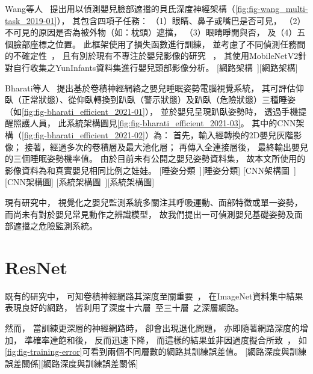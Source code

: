 \documentclass[class=NCU_thesis, crop=false]{standalone}
\begin{document}
Wang等人~\cite{wang_multi-task_2019}
提出用以偵測嬰兒臉部遮擋的貝氏深度神經架構（\cref{fig:fig-wang_multi-task_2019-01}），
其包含四項子任務：
（1）眼睛、鼻子或嘴巴是否可見，
（2）不可見的原因是否為被外物（如：枕頭）遮擋，
（3）眼睛睜開與否，
及（4）五個臉部座標之位置。
此框架使用了損失函數進行訓練，
並考慮了不同偵測任務間的不確定性~\cite{kendall_what_2017}，
且有別於現有不專注於嬰兒影像的研究
~\cite{viitaniemi_detecting_2013, ge_detecting_2017, ghiasi_using_2015}，
其使用MobileNetV2針對自行收集之YunInfants資料集進行嬰兒頭部影像分析。
[網路架構~\cite{wang_multi-task_2019}][網路架構]

Bharati等人~\cite{bharati_efficient_2021}
提出基於卷積神經網絡之嬰兒睡眠姿勢電腦視覺系統，
其可評估仰臥（正常狀態）、從仰臥轉換到趴臥（警示狀態）及趴臥（危險狀態）三種睡姿
（如\cref{fig:fig-bharati_efficient_2021-01}），
並於嬰兒呈現趴臥姿勢時，
透過手機提醒照護人員，
此系統架構圖見\cref{fig:fig-bharati_efficient_2021-03}。
其中的CNN架構（\cref{fig:fig-bharati_efficient_2021-02}）為：
首先，輸入經轉換的2D嬰兒灰階影像；
接著，經過多次的卷積層及最大池化層；
再傳入全連接層後，
最終輸出嬰兒的三個睡眠姿勢機率值。
由於目前未有公開之嬰兒姿勢資料集，
故本文所使用的影像資料為和真實嬰兒相同比例之娃娃。
[睡姿分類~\cite{bharati_efficient_2021}][睡姿分類]
[CNN架構圖~\cite{bharati_efficient_2021}][CNN架構圖]
[系統架構圖~\cite{bharati_efficient_2021}][系統架構圖]

現有研究中，
視覺化之嬰兒監測系統多關注其呼吸運動、面部特徵或單一姿勢，
而尚未有對於嬰兒常見動作之辨識模型，
故我們提出一可偵測嬰兒基礎姿勢及面部遮擋之危險監測系統。

\section{ResNet}
既有的研究中，
可知卷積神經網路其深度至關重要~\cite{simonyan_very_2015, szegedy_going_2015}，
在ImageNet資料集中結果表現良好的網路，
皆利用了深度十六層~\cite{simonyan_very_2015}至三十層~\cite{ioffe_batch_2015}之深層網路。

然而，
當訓練更深層的神經網路時，
卻會出現退化問題，
亦即隨著網路深度的增加，
準確率達飽和後，
反而迅速下降，
而這樣的結果並非因過度擬合所致~\cite{he_convolutional_2015, srivastava_highway_2015}，
如\cref{fig:fig-training-error}可看到兩個不同層數的網路其訓練誤差值。
[網路深度與訓練誤差關係][網路深度與訓練誤差關係]
\end{document}
